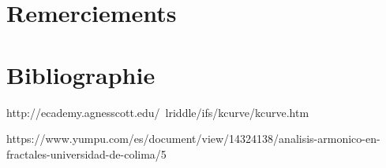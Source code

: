 \documentclass[a4paper, 12pt]{report}
\begin{document}
	\chapter*{Remerciements}
	
	
	\chapter*{Bibliographie}
				
http://ecademy.agnesscott.edu/~lriddle/ifs/kcurve/kcurve.htm

https://www.yumpu.com/es/document/view/14324138/analisis-armonico-en-fractales-universidad-de-colima/5
\end{document}
